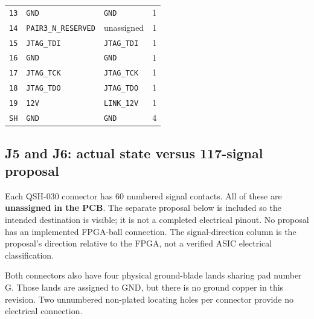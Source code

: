 \documentclass[11pt,a4paper]{article}
\begin{document}
\begin{longtable}{@{}P{14mm}P{63mm}P{67mm}P{22mm}@{}}
\nolinkurl{13} & \nolinkurl{GND} & \nolinkurl{GND} & 1 \\
\nolinkurl{14} & \nolinkurl{PAIR3_N_RESERVED} & \textcolor{muted}{unassigned} & 1 \\
\nolinkurl{15} & \nolinkurl{JTAG_TDI} & \nolinkurl{JTAG_TDI} & 1 \\
\nolinkurl{16} & \nolinkurl{GND} & \nolinkurl{GND} & 1 \\
\nolinkurl{17} & \nolinkurl{JTAG_TCK} & \nolinkurl{JTAG_TCK} & 1 \\
\nolinkurl{18} & \nolinkurl{JTAG_TDO} & \nolinkurl{JTAG_TDO} & 1 \\
\nolinkurl{19} & \nolinkurl{12V} & \nolinkurl{LINK_12V} & 1 \\
\nolinkurl{SH} & \nolinkurl{GND} & \nolinkurl{GND} & 4 \\
\end{longtable}\endgroup

\subsection{J5 and J6: actual state versus 117-signal proposal}
Each QSH-030 connector has 60 numbered signal contacts. All of these are \textbf{unassigned in the PCB}. The separate proposal below is included so the intended destination is visible; it is not a completed electrical pinout. No proposal has an implemented FPGA-ball connection. The signal-direction column is the proposal's direction relative to the FPGA, not a verified ASIC electrical classification.

Both connectors also have four physical ground-blade lands sharing pad number G. Those lands are assigned to GND, but there is no ground copper in this revision. Two unnumbered non-plated locating holes per connector provide no electrical connection.
\end{document}
